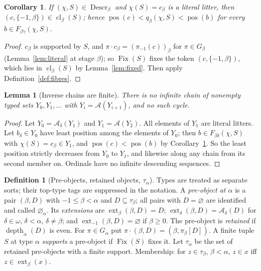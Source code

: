 \documentclass[11pt]{article}
\newtheorem{lemma}[theorem]{Lemma}
\newtheorem{corollary}[theorem]{Corollary}
\theoremstyle{definition}
\newtheorem{definition}[theorem]{Definition}
\theoremstyle{remark}
\newcommand{\Fix}{\operatorname{Fix}}
\newcommand{\cl}{\operatorname{cl}}
\newcommand{\pos}{\operatorname{pos}}
\newcommand{\ext}{\operatorname{ext}}
\newcommand{\dep}{\operatorname{depth}}
\newcommand{\Descr}{\operatorname{Descr}}
\newcommand{\calA}{\mathcal A}
\begin{document}
\begin{corollary}\label{cor:literal-in-closure}
If \((\chi,S)\in\Descr_\beta\) and \(\chi(S)=c_\beta\) is a literal
litter, then \((c,\{-1,\beta\})\in\cl_\beta(S)\); hence
\(\pos(c)<q_\beta(\chi,S)<\pos(b)\) for every \(b\in F_{\beta\gamma}
(\chi,S)\).
\end{corollary}
\begin{proof}
\(c_\beta\) is supported by \(S\), and \(\pi\cdot c_\beta=(\pi_{-1}(c))_
\beta\) for \(\pi\in G_\beta\) (Lemma~\ref{lem:literal} at stage
\(\beta\)); so \(\Fix(S)\) fixes the token \((c,\{-1,\beta\})\), which
lies in \(\cl_\beta(S)\) by Lemma~\ref{lem:fixed}. Then apply
Definition~\ref{def:fibres}.
\end{proof}

\begin{lemma}[Inverse chains are finite]\label{lem:depth}
There is no infinite chain of nonempty typed sets
\(Y_0,Y_1,\dots\) with \(Y_i=\calA(Y_{i+1})\), and no such cycle.
\end{lemma}
\begin{proof}
Let \(Y_0=\calA_\delta(Y_1)\) and \(Y_1=\calA(Y_2)\). All elements of
\(Y_1\) are literal litters. Let \(b_\delta\in Y_0\) have least position
among the elements of \(Y_0\); then \(b\in F_{\beta\delta}(\chi,S)\) with
\(\chi(S)=c_\beta\in Y_1\), and \(\pos(c)<\pos(b)\) by
Corollary~\ref{cor:literal-in-closure}. So the least position strictly
decreases from \(Y_0\) to \(Y_1\), and likewise along any chain from its
second member on. Ordinals have no infinite descending sequences.
\end{proof}

\begin{definition}[Pre-objects, retained objects, \(\tau_\alpha\)]
Types are treated as separate sorts; their top-type tags are suppressed
in the notation. A \emph{pre-object at \(\alpha\)} is a pair \((\beta,D)\) with \(-1\leq
\beta<\alpha\) and \(D\subseteq\tau_\beta\); all pairs with \(D=\varnothing
\) are identified and called \(\varnothing_\alpha\). Its \emph{extensions}
are \(\ext_\beta(\beta,D)=D\); \(\ext_\delta(\beta,D)=\calA_\delta(D)\)
for \(\delta\in\omega\), \(\delta<\alpha\), \(\delta\neq\beta\); and
\(\ext_{-1}(\beta,D)=\varnothing\) if \(\beta\geq0\). The pre-object is
\emph{retained} if \(\dep_\alpha(D)\) is even. For \(\pi\in G_\alpha\) put
\(\pi\cdot(\beta,D)=(\beta,\pi_\beta[D])\). A finite tuple \(S\) at type
\(\alpha\) \emph{supports} a pre-object if \(\Fix(S)\) fixes it. Let
\(\tau_\alpha\) be the set of retained pre-objects with a finite support.
Membership: for \(z\in\tau_\beta\), \(\beta<\alpha\), \(z\in x\) iff
\(z\in\ext_\beta(x)\).
\end{definition}
\end{document}
